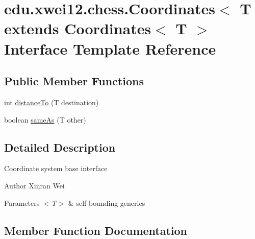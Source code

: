 \hypertarget{interfaceedu_1_1xwei12_1_1chess_1_1_coordinates}{}\section{edu.\+xwei12.\+chess.\+Coordinates$<$ T extends Coordinates$<$ T $>$ Interface Template Reference}
\label{interfaceedu_1_1xwei12_1_1chess_1_1_coordinates}
\subsection*{Public Member Functions}
\begin{DoxyCompactItemize}
\item 
int \hyperlink{interfaceedu_1_1xwei12_1_1chess_1_1_coordinates_ab6dc5103fcf749a58ebc0fbed61ca7e2}{distance\+To} (T destination)
\item 
boolean \hyperlink{interfaceedu_1_1xwei12_1_1chess_1_1_coordinates_a7fddb94af1c1810f4292d1b047aaa1f9}{same\+As} (T other)
\end{DoxyCompactItemize}


\subsection{Detailed Description}
Coordinate system base interface \begin{DoxyAuthor}{Author}
Xinran Wei 
\end{DoxyAuthor}

\begin{DoxyParams}{Parameters}
{\em $<$\+T$>$} & self-\/bounding generics \\
\hline
\end{DoxyParams}


\subsection{Member Function Documentation}
